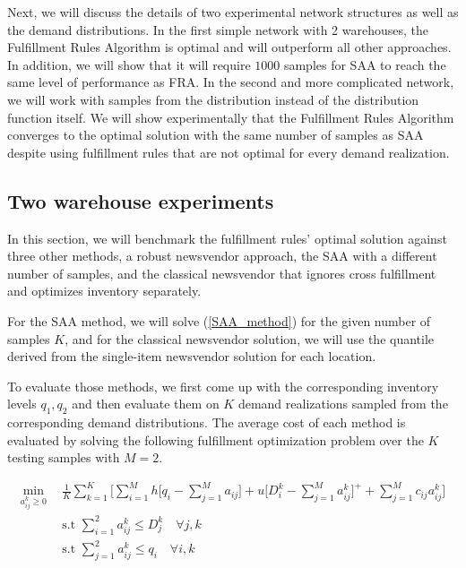 \documentclass[poms,final,blindrev]{poms1_V1} %
\begin{document}
Next, we will discuss the details of two experimental network structures as well as the demand distributions.
In the first simple network with 2 warehouses, the Fulfillment Rules Algorithm is optimal and will outperform all other approaches. In addition, we will show that it 
will require $1000$ samples for SAA to reach the same level of performance as FRA.
In the second and more complicated network, we will work with samples from the distribution instead of the distribution function itself. We will show experimentally that the Fulfillment Rules Algorithm converges to the optimal solution with the same number of samples as SAA despite using fulfillment rules that are not optimal for every demand realization.


\subsection{Two warehouse experiments}
\label{section:two}



In this section, we will benchmark the fulfillment rules' optimal solution against three other methods, a robust newsvendor approach, the SAA with a different number of samples, and the classical newsvendor that ignores cross fulfillment and optimizes inventory separately.



For the SAA method, we will solve (\ref{SAA_method}) for the given number of samples $K$, and for the classical newsvendor solution, we will use the quantile derived from the single-item newsvendor solution for each location. 

To evaluate those methods, we first come up with the corresponding inventory levels $q_1,q_2$ and then evaluate them on $K$ demand realizations sampled from the corresponding demand distributions. The average cost of each method is evaluated by solving the following fulfillment optimization problem over the $K$ testing samples with $M=2$.

\begin{equation}
\label{empirical_cost}
\begin{aligned}
\min_{a^k_{ij} \geq 0} \ \
 &\frac{1}{K}\sum_{k=1}^{K} \bigg[ \sum_{i=1}^{M}  h \big[ q_i - \sum_{j=1}^{M} a_{ij} \big]   +  u \big[ D^k_i - \sum_{j=1}^{M}  a^k_{ij}\big]^+ +  \sum_{j=1}^{M}    c_{ij} a^k_{ij} \bigg]\\
 & \text{s.t } \sum_{i=1}^{2} a^k_{ij} \leq D^k_j \quad \forall j,k \\
 & \text{s.t } \sum_{j=1}^{2} a^k_{ij} \leq q_i \quad \forall i,k
\end{aligned}
\end{equation}
\end{document}
